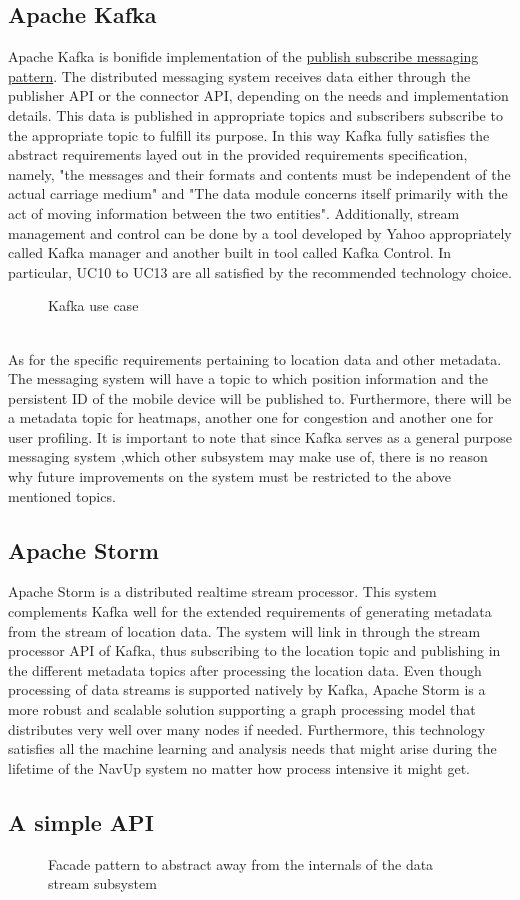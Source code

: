 \subsection{Apache Kafka}
Apache Kafka is bonifide implementation of the \underline{publish subscribe messaging pattern}.
The distributed messaging system receives data either through the publisher API or the connector API, depending on the needs and implementation details. This data is published in appropriate topics and subscribers subscribe to the appropriate topic to fulfill its purpose. In this way Kafka fully satisfies the abstract requirements layed out in the provided requirements specification, namely, "the messages and their formats and contents must be independent of the actual carriage medium" and "The data module concerns itself primarily with the act of moving information between the two entities". Additionally, stream management and control can be done by a tool developed by Yahoo appropriately called Kafka manager and another built in tool called Kafka Control. In particular, UC10 to UC13 are all satisfied by the recommended technology choice.\par
\bigskip
\noindent
\begin{figure}[h]
\caption{Kafka use case}
\end{figure}
\mbox{}\\
\noindent
As for the specific requirements pertaining to location data and other metadata. The messaging system will have a topic to which position information and the persistent ID of the mobile device will be published to. Furthermore, there will be a metadata topic for heatmaps, another one for congestion and another one for user profiling.
It is important to note that since Kafka serves as a general purpose messaging system ,which other subsystem may make use of, there is no reason why future improvements on the system must be restricted to the above mentioned topics.

\subsection{Apache Storm}
Apache Storm is a distributed realtime stream processor. This system complements Kafka well for the extended requirements of generating metadata from the stream of location data. The system will link in through the stream processor API of Kafka, thus subscribing to the location topic and publishing in the different metadata topics after processing the location data. Even though processing of data streams is supported natively by Kafka, Apache Storm is a more robust and scalable solution supporting a graph processing model that distributes very well over many nodes if needed. Furthermore, this technology satisfies all the machine learning and analysis needs that might arise during the lifetime of the NavUp system no matter how process intensive it might get.
\pagebreak
\subsection{A simple API}
\begin{figure}[h]
\caption{Facade pattern to abstract away from the internals of the data stream subsystem}
\end{figure}
